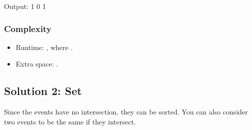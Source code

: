 \documentclass[letterpaper,12pt,english]{book}
\begin{document}
\begin{sphinxVerbatim}[commandchars=\\\{\}]
\end{sphinxVerbatim}

\begin{sphinxVerbatim}[commandchars=\\\{\}]
Output:
1
0
1
\end{sphinxVerbatim}


\subsubsection{Complexity}
\label{\detokenize{Sorting/04_SORT_729_My_Calendar_I:complexity}}\begin{itemize}
\item {} 
\sphinxAtStartPar
Runtime: , where .

\item {} 
\sphinxAtStartPar
Extra space: .

\end{itemize}


\subsection{Solution 2: Set}
\label{\detokenize{Sorting/04_SORT_729_My_Calendar_I:solution-2-set}}
\sphinxAtStartPar
Since the events have no intersection, they can be sorted. You can also consider two events to be the same if they intersect.
\end{document}
